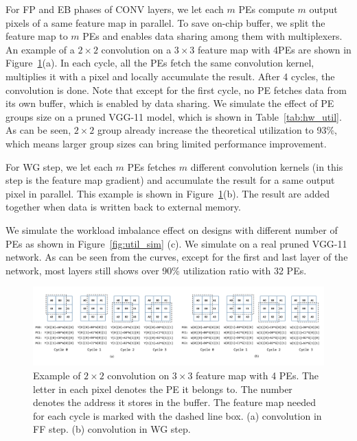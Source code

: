 For FP and EB phases of CONV layers, we let each $m$ PEs compute $m$ output pixels of a same feature map in parallel. To save on-chip buffer, we split the feature map to $m$ PEs and enables data sharing among them with multiplexers. An example of a $2\times 2$ convolution on a $3\times 3$ feature map with 4PEs are shown in Figure~\ref{fig:mmap}(a). In each cycle, all the PEs fetch the same convolution kernel, multiplies it with a pixel and locally accumulate the result. After 4 cycles, the convolution is done. Note that except for the first cycle, no PE fetches data from its own buffer, which is enabled by data sharing. We simulate the effect of PE groups size on a pruned VGG-11 model, which is shown in Table~\ref{tab:hw_util}. As can be seen, $2\times 2$ group already increase the theoretical utilization to 93\%, which means larger group sizes can bring limited performance improvement. 



For WG step, we let each $m$ PEs fetches $m$ different convolution kernels (in this step is the feature map gradient) and accumulate the result for a same output pixel in parallel. This example is shown in Figure~\ref{fig:mmap}(b). The result are added together when data is written back to external memory. 

We simulate the workload imbalance effect on designs with different number of PEs as shown in Figure~\ref{fig:util_sim} (c). We simulate on a real pruned VGG-11 network. As can be seen from the curves, except for the first and last layer of the network, most layers still shows over 90\% utilization ratio with 32 PEs.

\begin{figure}[t]
  \centering
  \includegraphics[width=2.0\columnwidth]{figures/mmap.pdf}
  \caption{Example of $2\times 2$ convolution on $3\times 3$ feature map with 4 PEs. The letter in each pixel denotes the PE it belongs to. The number denotes the address it stores in the buffer. The feature map needed for each cycle is marked with the dashed line box. (a) convolution in FF step. (b) convolution in WG step.}
  \label{fig:mmap}
\end{figure}

